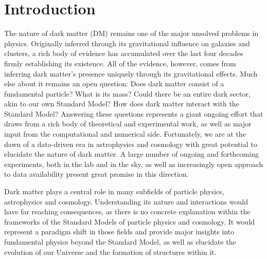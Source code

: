 \chapter{Introduction}
\label{ch:intro}

The nature of dark matter (DM) remains one of the major unsolved problems in physics. Originally inferred through its gravitational influence on galaxies and clusters, a rich body of evidence has accumulated over the last four decades firmly establishing its existence. All of the evidence, however, comes from inferring dark matter's presence uniquely through its gravitational effects. Much else about it remains an open question: Does dark matter consist  of a fundamental particle? What is its mass? Could there be an entire dark sector, akin to our own Standard Model? How does dark matter interact with the Standard Model? Answering these questions represents a giant ongoing effort that draws from a rich body of theoretical and experimental work, as well as major input from the computational and numerical side. Fortunately, we are at the dawn of a data-driven era in astrophysics and cosmology with great potential to elucidate the nature of dark matter. A large number of ongoing and forthcoming experiments, both in the lab and in the sky, as well as increasingly open approach to data availability present great promise in this direction. 

Dark matter plays a central role in many subfields of particle physics, astrophysics and cosmology. Understanding its nature and interactions would have far reaching consequences, as there is no concrete explanation within the frameworks of the Standard Models of particle physics and cosmology. It would represent a paradigm shift in those fields and provide major insights into fundamental physics beyond the Standard Model, as well as elucidate the evolution of our Universe and the formation of structures within it. 


